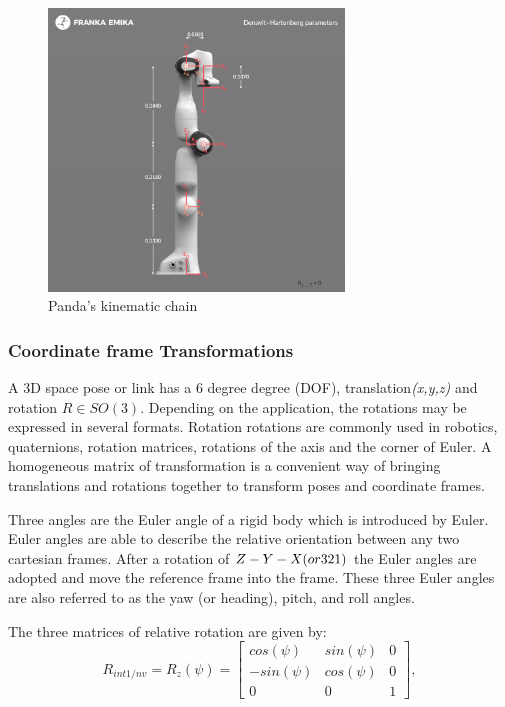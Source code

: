 \begin{figure}[h]
    \centering
    \includegraphics[width=0.7\textwidth]{graphics/pandakinematicchain.png}
    \caption{Panda’s kinematic chain \cite{noauthor_robot_nodate}}
    \label{fig:pandachain}
\end{figure}

\subsubsection*{Coordinate frame Transformations}
A 3D space pose or link has a 6 degree degree (DOF), translation\textit{(x,y,z)} and rotation $R \in SO(3)$. Depending on the application, the rotations may be expressed in several formats. Rotation rotations are commonly used in robotics, quaternions, rotation matrices, rotations of the axis and the corner of Euler. A homogeneous matrix of transformation is a convenient way of bringing translations and rotations together to transform poses and coordinate frames\cite{cai_coordinate_2011}.

Three angles are the Euler angle of a rigid body which is introduced by Euler. Euler angles are able to describe the relative orientation between any two cartesian frames. After a rotation of $Z-Y-X (or 3\-2\-1)$ the Euler angles are adopted and move the reference frame into the frame. These three Euler angles are also referred to as the yaw (or heading), pitch, and roll angles\cite{cai_coordinate_2011}.

The three matrices of relative rotation are given by:
\begin{equation}
    R_{int1/nv} = R_{z}(\psi) = \begin{bmatrix}
cos(\psi)  & sin(\psi) & 0\\ 
-sin(\psi) & cos(\psi) & 0 \\ 
0 & 0 & 1
\end{bmatrix},
\end{equation}\label{eq:rz}

